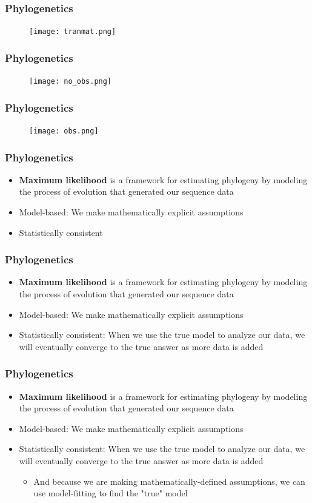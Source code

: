 \documentclass{beamer}
\begin{document}
\begin{frame}
\frametitle{Phylogenetics}
\begin{figure}
    \texttt{[image: tranmat.png]}
    \end{figure}
\end{frame} 

\begin{frame}
\frametitle{Phylogenetics}
\begin{figure}
    \texttt{[image: no\_obs.png]}
    \end{figure}
\end{frame} 

\begin{frame}
\frametitle{Phylogenetics}
\begin{figure}
    \texttt{[image: obs.png]}
    \end{figure}
\end{frame} 

\begin{frame}
\frametitle{Phylogenetics}
\begin{itemize}
\item \textbf{Maximum likelihood} is a framework for estimating phylogeny by modeling the process of evolution that generated our sequence data
\item Model-based: We make mathematically explicit assumptions 
\item Statistically consistent
\end{itemize}
\end{frame}

\begin{frame}
\frametitle{Phylogenetics}
\begin{itemize}
\item \textbf{Maximum likelihood} is a framework for estimating phylogeny by modeling the process of evolution that generated our sequence data
\item Model-based: We make mathematically explicit assumptions 
\item Statistically consistent: When we use the true model to analyze our data, we will eventually converge to the true answer as more data is added
\end{itemize}
\end{frame}
\begin{frame}
\frametitle{Phylogenetics}
\begin{itemize}
\item \textbf{Maximum likelihood} is a framework for estimating phylogeny by modeling the process of evolution that generated our sequence data
\item Model-based: We make mathematically explicit assumptions 
\item Statistically consistent: When we use the true model to analyze our data, we will eventually converge to the true answer as more data is added
\begin{itemize}
\item And because we are making mathematically-defined assumptions, we can use model-fitting to find the "true" model
\end{itemize}
\end{itemize}
\end{frame}
\end{document}
